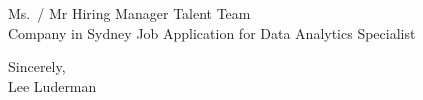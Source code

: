 \documentclass[11 pt,oneside,a4paper,titlepage]{article}
\begin{document}
\coverheader{\myHeaderColor}{\myFirstName}{\myLastName}{\myDescription}{\myTextColor}

{Ms.\ / Mr Hiring Manager}
{Talent Team\\Company in Sydney}
{Job Application for Data Analytics Specialist}

{\lipsum[20]}


{
    \vspace*{0.4cm}
    Sincerely,\\
    Lee Luderman
}

\pagebreak
\end{document}
